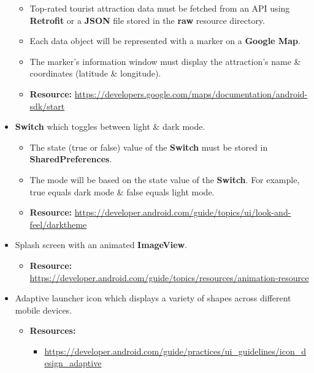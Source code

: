 \documentclass{article}
\begin{document}
\begin{itemize}
	      \begin{itemize}
		      \item Top-rated tourist attraction data must be fetched from an API using \textbf{Retrofit} or a \textbf{JSON} file stored in the \textbf{raw} resource directory.
		      \item Each data object will be represented with a marker on a \textbf{Google Map}.
		      \item The marker's information window must display the attraction's name \& coordinates (latitude \& longitude).
		      \item \textbf{Resource:} \footnotesize\href{https://developers.google.com/maps/documentation/android-sdk/start}{https://developers.google.com/maps/documentation/android-sdk/start}
	      \end{itemize}
	\item \textbf{Switch} which toggles between light \& dark mode.
	      \begin{itemize}
		      \item The state (true or false) value of the \textbf{Switch} must be stored in \textbf{SharedPreferences}.
		      \item The mode will be based on the state value of the \textbf{Switch}. For example, true equals dark mode \& false equals light mode.
		      \item \textbf{Resource:} \footnotesize\href{https://developer.android.com/guide/topics/ui/look-and-feel/darktheme}{https://developer.android.com/guide/topics/ui/look-and-feel/darktheme}
	      \end{itemize}
	\item Splash screen with an animated \textbf{ImageView}.
	      \begin{itemize}
		      \item \textbf{Resource:} \footnotesize\href{https://developer.android.com/guide/topics/resources/animation-resource}{https://developer.android.com/guide/topics/resources/animation-resource}
	      \end{itemize}
	\item Adaptive launcher icon which displays a variety of shapes across different mobile devices.
	      \begin{itemize}
		      \item \textbf{Resources:}
		            \begin{itemize}
			            \item \footnotesize\href{https://developer.android.com/guide/practices/ui\_guidelines/icon\_design\_adaptive}{https://developer.android.com/guide/practices/ui\_guidelines/icon\_design\_adaptive}

\end{itemize}
\end{itemize}
\end{itemize}
\end{document}
